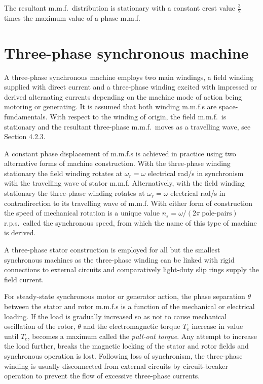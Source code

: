 \documentclass[a4paper,numbers=noenddot,12pt]{scrbook}
\begin{document}
    The resultant m.m.f.\ distribution is stationary with a constant crest value $\frac{3}{2}$ times the maximum value of a phase m.m.f.
    \chapter{Three-phase synchronous machine}

    A three-phase synchronous machine employs two main windings, a field winding supplied with direct current and a three-phase winding excited with impressed or derived alternating currents depending on the machine mode of action being motoring or generating. It is assumed that both winding m.m.f.s are space-fundamentals. With respect to the winding of origin, the field m.m.f.\ is stationary and the resultant three-phase m.m.f.\ moves as a travelling wave, see Section 4.2.3.

    A constant phase displacement of m.m.f.s is achieved in practice using two alternative forms of machine construction. With the three-phase winding stationary the field winding rotates at $\omega_r = \omega$ electrical rad/s in synchronism with the travelling wave of stator m.m.f. Alternatively, with the field winding stationary the three-phase winding rotates at $\omega_r = \omega$ electrical rad/s in contradirection to its travelling wave of m.m.f. With either form of construction the speed
    of mechanical rotation is a unique value $n_s = \omega / (2 \pi\ \text{pole-pairs})$ r.p.s.\ called the synchronous speed, from which the name of this type of machine is derived.

    A three-phase stator construction is employed for all but the smallest synchronous machines as the three-phase winding can be linked with rigid connections to external circuits and comparatively light-duty slip rings supply the field current. 

    For steady-state synchronous motor or generator action, the phase separation $\theta$ between the stator and rotor m.m.f.s is a function of the mechanical or electrical loading. If the load is gradually increased so as not to cause mechanical oscillation of the rotor, $\theta$ and the electromagnetic torque $T_e$ increase in value until $T_e$, becomes a maximum called the \textit{pull-out torque}. Any attempt to increase the load further, breaks the magnetic locking of the stator and rotor
    fields and synchronous operation is lost. Following loss of synchronism, the three-phase winding is usually disconnected from external circuits by circuit-breaker operation to prevent the flow of excessive three-phase currents.
\end{document}
